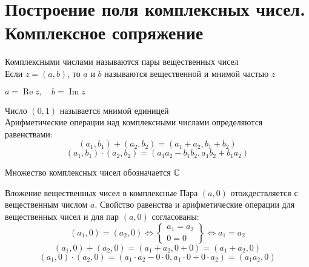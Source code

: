 \section{Построение поля комплексных чисел. Комплексное сопряжение}

\begin{definition}
	Комплексными числами называются пары вещественных чисел \\
	Если $z = (a, b)$, то $a$ и $b$ называются вещественной и мнимой частью $z$
	\begin{notation}
		$a = \operatorname{Re} z, \quad b = \operatorname{Im} z $
	\end{notation}
	Число $(0, 1)$ называется мнимой единицей \\
	Арифметические операции над комплексными числами определяются равенствами:
	$$ (a_1, b_1) + (a_2, b_2) = (a_1 + a_2, b_1 + b_2) $$
	$$ (a_1, b_1) \cdot (a_2, b_2) = (a_1a_2 - b_1b_2, a_1b_2 + b_1a_2) $$
\end{definition}

\begin{notation}
	Множество комплексных чисел обозначается $\mathbb{C}$
\end{notation}

\begin{undefthm}{Вложение вещественных чисел в комплексные}
	Пара $(a, 0)$ отождествляется с вещественным числом $a$. Свойство равенства и арифметические операции для вещественных чисел и для пар $(a, 0)$ согласованы:
	$$ (a_1, 0) = (a_2, 0) \iff
	\begin{Bmatrix}
		a_1 = a_2 \\
		0 = 0
	\end{Bmatrix} \iff a_1 = a_2 $$
	$$ (a_1, 0) + (a_2, 0) = (a_1 + a_2, 0 + 0) = (a_1 + a_2, 0) $$
	$$ (a_1, 0) \cdot (a_2, 0) = (a_1 \cdot a_2 - 0 \cdot 0, a_1 \cdot 0 + 0 \cdot a_2) = (a_1a_2, 0) $$
\end{undefthm}

